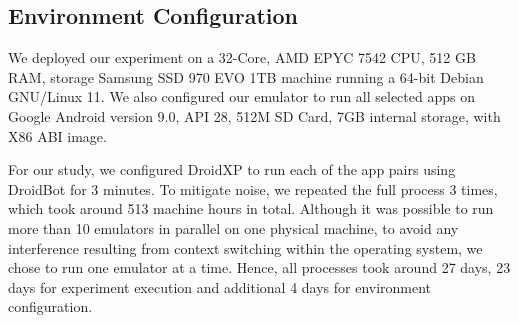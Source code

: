 \subsection{Environment Configuration}\label{sec:hardware}


We deployed our experiment on a 32-Core, AMD EPYC 7542 CPU, 512 GB RAM, storage Samsung SSD 970 EVO 1TB machine running a 64-bit Debian GNU/Linux 11. We also configured our emulator to run all selected apps on Google Android version 9.0, API 28, 512M SD Card, 7GB internal storage, with X86 ABI image.

For our study, we configured DroidXP to run each of the \apps app pairs using DroidBot for 3 minutes. To mitigate noise, we repeated the full process 3 times,  which took around 513 machine hours in total. Although it was possible to run more than 10 emulators in parallel on one physical machine, to avoid any interference resulting from context switching within the operating system, we chose to run one emulator at a time. Hence, all processes took around 27 days, 23 days for experiment execution and additional 4 days for environment configuration.%

